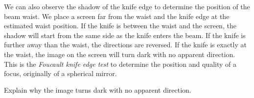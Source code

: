 We can also observe the shadow of the knife edge to determine the position of the beam waist. We place a screen far from the waist and the knife edge at the estimated waist position. If the knife is between the waist and the screen, the shadow will start from the same side as the knife enters the beam. If the knife is further away than the waist, the directions are reversed. If the knife is exactly at the waist, the image on the screen will turn dark with no apparent direction. This is the \emph{Foucault knife edge test} to determine the position and quality of a focus, originally of a spherical mirror.

\begin{questions}
    \item Explain why the image turns dark with no apparent direction.
\end{questions}

\printbibliography[segment=\therefsegment,heading=subbibliography]
